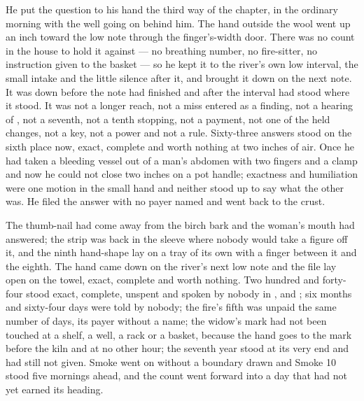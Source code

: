 He put the question to his hand the third way of the chapter, in the ordinary morning with the well going on behind him. The hand outside the wool went up an inch toward the low note through the finger's-width door. There was no count in the house to hold it against --- no breathing number, no fire-sitter, no instruction given to the basket --- so he kept it to the river's own low interval, the small intake and the little silence after it, and brought it down on the next note. It was down before the note had finished and after the interval had stood where it stood. It was not a longer reach, not a miss entered as a finding, not a hearing of , not a seventh, not a tenth stopping, not a payment, not one of the held changes, not a key, not a power and not a rule. Sixty-three answers stood on the sixth place now, exact, complete and worth nothing at two inches of air. Once he had taken a bleeding vessel out of a man's abdomen with two fingers and a clamp and now he could not close two inches on a pot handle; exactness and humiliation were one motion in the small hand and neither stood up to say what the other was. He filed the answer with no payer named and went back to the crust.

The thumb-nail had come away from the birch bark and the woman's mouth had answered; the strip was back in the sleeve where nobody would take a figure off it, and the ninth hand-shape lay on a tray of its own with a finger between it and the eighth. The hand came down on the river's next low note and the file lay open on the towel, exact, complete and worth nothing. Two hundred and forty-four stood exact, complete, unspent and spoken by nobody in ,  and ; six months and sixty-four days were told by nobody; the fire's fifth was unpaid the same number of days, its payer without a name; the widow's mark had not been touched at a shelf, a well, a rack or a basket, because the hand goes to the mark before the kiln and at no other hour; the seventh year stood at its very end and had still not given. Smoke went on without a boundary drawn and Smoke 10 stood five mornings ahead, and the count went forward into a day that had not yet earned its heading.
